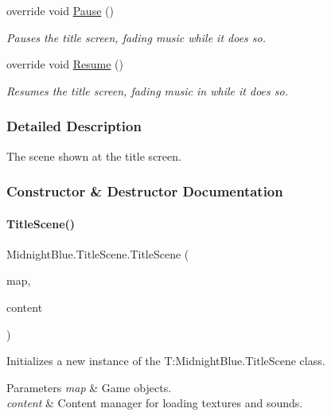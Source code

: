 \begin{DoxyCompactItemize}
override void \hyperlink{class_midnight_blue_1_1_title_scene_a046934bfa3290d443b58bcc1de0919db}{Pause} ()
\begin{DoxyCompactList}\small\item\em Pauses the title screen, fading music while it does so. \end{DoxyCompactList}\item 
override void \hyperlink{class_midnight_blue_1_1_title_scene_afb0bb3ad8b2766b5d57537dc1ef22249}{Resume} ()
\begin{DoxyCompactList}\small\item\em Resumes the title screen, fading music in while it does so. \end{DoxyCompactList}\end{DoxyCompactItemize}


\subsubsection{Detailed Description}
The scene shown at the title screen. 



\subsubsection{Constructor \& Destructor Documentation}
\hypertarget{class_midnight_blue_1_1_title_scene_a409eb89a58dbec10d5a0002ce78bc9a3}{}\label{class_midnight_blue_1_1_title_scene_a409eb89a58dbec10d5a0002ce78bc9a3} 
\paragraph{\texorpdfstring{Title\+Scene()}{TitleScene()}}
{\footnotesize\ttfamily Midnight\+Blue.\+Title\+Scene.\+Title\+Scene (\begin{DoxyParamCaption}\item[{Entity\+Map}]{map,  }\item[{Content\+Manager}]{content }\end{DoxyParamCaption})\hspace{0.3cm}{\ttfamily [inline]}}



Initializes a new instance of the T\+:\+Midnight\+Blue.\+Title\+Scene class. 


\begin{DoxyParams}{Parameters}
{\em map} & Game objects.\\
\hline
{\em content} & Content manager for loading textures and sounds.\\
\hline
\end{DoxyParams}


